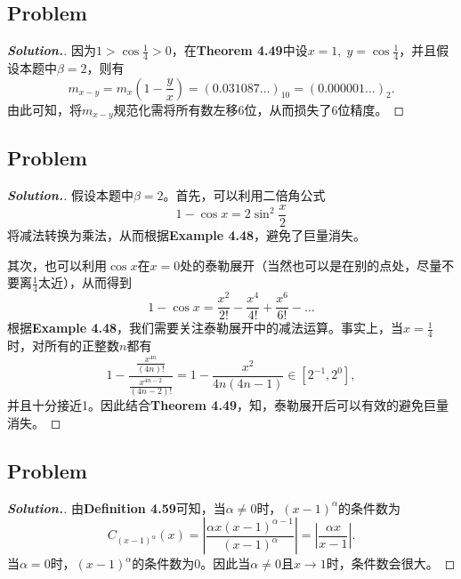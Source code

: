 \documentclass{ctexart}
\begin{document}
\begin{sloppypar}
\subsection*{Problem \uppercase\expandafter{}}
\begin{proof}[\textbf{Solution.}]
因为$1>\cos{\frac{1}{4}}>0$，在\textbf{Theorem 4.49}中设$x=1,\;y=\cos{\frac{1}{4}}$，并且假设本题中$\beta = 2$，则有
\begin{equation}
    m_{x-y} = m_x(1-\frac{y}{x}) = (0.031087\dots)_{10} = (0.000001\dots)_2.
\end{equation}
由此可知，将$m_{x-y}$规范化需将所有数左移6位，从而损失了6位精度。
\end{proof}

\subsection*{Problem \uppercase\expandafter{}}
\begin{proof}[\textbf{Solution.}]
假设本题中$\beta = 2$。首先，可以利用二倍角公式
\begin{equation}
    1-\cos{x} = 2\sin^2{\frac{x}{2}}
\end{equation}
将减法转换为乘法，从而根据\textbf{Example 4.48}，避免了巨量消失。

其次，也可以利用$\cos{x}$在$x=0$处的泰勒展开（当然也可以是在别的点处，尽量不要离$\frac{1}{4}$太近），从而得到
\begin{equation}
    1-\cos{x} = \frac{x^2}{2!}- \frac{x^4}{4!}+ \frac{x^6}{6!}-\dots
\end{equation}
根据\textbf{Example 4.48}，我们需要关注泰勒展开中的减法运算。事实上，当$x=\frac{1}{4}$时，对所有的正整数$n$都有
\begin{equation}
    1-\frac{\frac{x^{4n}}{(4n)!}}{\frac{x^{4n-2}}{(4n-2)!}} = 1-\frac{x^2}{4n(4n-1)} \in [2^{-1},2^0],
\end{equation}
并且十分接近1。因此结合\textbf{Theorem 4.49}，知，泰勒展开后可以有效的避免巨量消失。
\end{proof}
\subsection*{Problem \uppercase\expandafter{}}
\begin{proof}[\textbf{Solution.}]
由\textbf{Definition 4.59}可知，当$\alpha \neq 0$时，$(x-1)^\alpha$的条件数为
\begin{equation}
    C_{(x-1)^\alpha}(x) = \left|\frac{\alpha x(x-1)^{\alpha-1}}{(x-1)^\alpha}\right|=\left|\frac{\alpha x}{x-1}\right|.
\end{equation}
当$\alpha = 0$时，$(x-1)^\alpha$的条件数为0。因此当$\alpha \neq 0$且$x \rightarrow 1$时，条件数会很大。


\end{proof}
\end{sloppypar}
\end{document}
